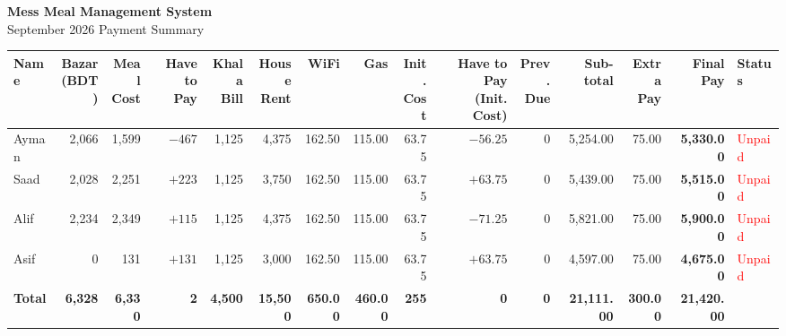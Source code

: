 \documentclass{article}
\begin{document}

\begin{center}
\LARGE\textbf{Mess Meal Management System}\\[4pt]
\Large September 2026 \quad Payment Summary
\end{center}

\vspace{0.4cm}

\begin{table}[h]
\centering
\normalsize
\renewcommand{\arraystretch}{1.8}
\setlength{\tabcolsep}{7pt}
\begin{tabular}{l r r r r r r r r r r r r r l}
\toprule
\rowcolor{blue!20}
\textbf{Name} &
\makecell{\textbf{Bazar}\\(BDT)} &
\makecell{\textbf{Meal}\\Cost} &
\makecell{\textbf{Have to}\\Pay} &
\makecell{\textbf{Khala}\\Bill} &
\makecell{\textbf{House}\\Rent} &
\textbf{WiFi} &
\textbf{Gas} &
\makecell{\textbf{Init.}\\Cost} &
\makecell{\textbf{Have to Pay}\\(Init. Cost)} &
\makecell{\textbf{Prev.}\\Due} &
\makecell{\textbf{Sub-}\\total} &
\makecell{\textbf{Extra}\\Pay} &
\makecell{\textbf{Final}\\Pay} &
\textbf{Status} \\
\midrule
\rowcolor{gray!10}
Ayman & 2,066 & 1,599 & $-467$ & 1,125 & 4,375 & 162.50 & 115.00 & 63.75 & $-56.25$ & 0 & 5,254.00 & 75.00 & \cellcolor{green!30}\textbf{5,330.00} & \textcolor{red}{Unpaid} \\
\rowcolor{white}
Saad  & 2,028 & 2,251 & $+223$ & 1,125 & 3,750 & 162.50 & 115.00 & 63.75 & $+63.75$ & 0 & 5,439.00 & 75.00 & \cellcolor{green!30}\textbf{5,515.00} & \textcolor{red}{Unpaid} \\
\rowcolor{gray!10}
Alif  & 2,234 & 2,349 & $+115$ & 1,125 & 4,375 & 162.50 & 115.00 & 63.75 & $-71.25$ & 0 & 5,821.00 & 75.00 & \cellcolor{green!30}\textbf{5,900.00} & \textcolor{red}{Unpaid} \\
\rowcolor{white}
Asif  & 0 & 131 & $+131$ & 1,125 & 3,000 & 162.50 & 115.00 & 63.75 & $+63.75$ & 0 & 4,597.00 & 75.00 & \cellcolor{green!30}\textbf{4,675.00} & \textcolor{red}{Unpaid} \\
\midrule
\rowcolor{green!30}
\textbf{Total} & \textbf{6,328} & \textbf{6,330} & \textbf{2} & \textbf{4,500} & \textbf{15,500} & \textbf{650.00} & \textbf{460.00} & \textbf{255} & \textbf{0} & \textbf{0} & \textbf{21,111.00} & \textbf{300.00} & \textbf{21,420.00} & \\
\bottomrule
\end{tabular}
\end{table}
\end{document}

